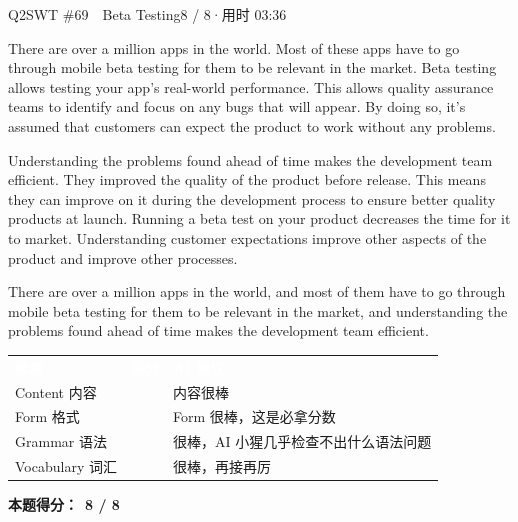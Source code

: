 \begin{qblock}{Q2\quad SWT \#69\ \ Beta Testing}{8 / 8\quad·\quad 用时 03:36}

\begin{promptbox}
There are over a million apps in the world. Most of these apps have to go through mobile beta testing for them to be relevant in the market. Beta testing allows testing your app's real-world performance. This allows quality assurance teams to identify and focus on any bugs that will appear. By doing so, it's assumed that customers can expect the product to work without any problems.

Understanding the problems found ahead of time makes the development team efficient. They improved the quality of the product before release. This means they can improve on it during the development process to ensure better quality products at launch. Running a beta test on your product decreases the time for it to market. Understanding customer expectations improve other aspects of the product and improve other processes.
\end{promptbox}

\begin{youbox}
There are over a million apps in the world, and most of them have to go through mobile beta testing for them to be relevant in the market, and understanding the problems found ahead of time makes the development team efficient.
\end{youbox}

{\small\scorehead
\begin{tabularx}{\linewidth}{l c Y}
\textcolor{white}{\bfseries 维度} & \textcolor{white}{\bfseries 得分} & \textcolor{white}{\bfseries AI 建议}\\
Content 内容        &  & 内容很棒\\
Form 格式          &  & Form 很棒，这是必拿分数\\
Grammar 语法       &  & 很棒，AI 小猩几乎检查不出什么语法问题\\
Vocabulary 词汇    &  & 很棒，再接再厉\\
\end{tabularx}}
\smallskip
\textbf{本题得分：}\ {\color{cAccent}\bfseries 8 / 8}

\end{qblock}

